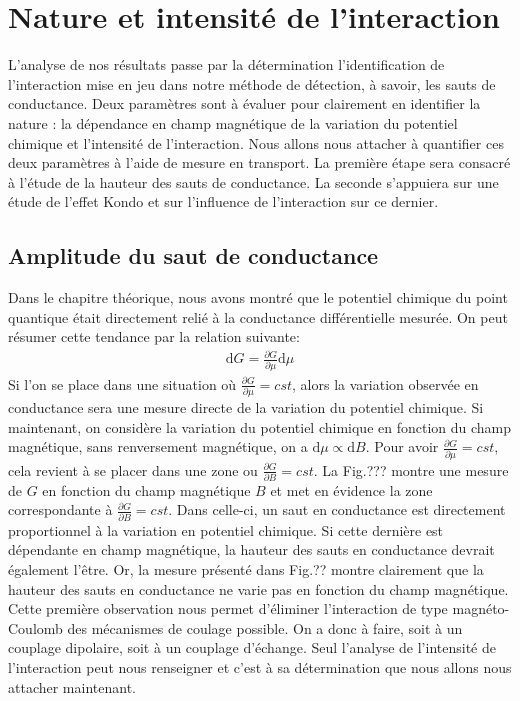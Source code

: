 \section{Nature et intensité de l'interaction}
L'analyse de nos résultats passe par la détermination l'identification de l'interaction mise en jeu dans notre méthode de détection, à savoir, les sauts de conductance. Deux paramètres sont à évaluer pour clairement en identifier la nature : la dépendance en champ magnétique de la variation du potentiel chimique et l'intensité de l'interaction. Nous allons nous attacher à quantifier ces deux paramètres à l'aide de mesure en transport. La première étape sera consacré à l'étude de la hauteur des sauts de conductance. La seconde s'appuiera sur une étude de l'effet Kondo et sur l'influence de l'interaction sur ce dernier.

\subsection{Amplitude du saut de conductance}
Dans le chapitre théorique, nous avons montré que le potentiel chimique du point quantique était directement relié à la conductance différentielle mesurée. On peut résumer cette tendance par la relation suivante:
\begin{eqnarray}
\text{d}G = \frac{\partial G}{\partial \mu} \text{d} \mu
\end{eqnarray}
Si l'on se place dans une situation où $\frac{\partial G}{\partial \mu} = cst$, alors la variation observée en conductance sera une mesure directe de la variation du potentiel chimique. Si maintenant, on considère la variation du potentiel chimique en fonction du champ magnétique, sans renversement magnétique, on a $\text{d}\mu \propto \text{d}B$. Pour avoir $\frac{\partial G}{\partial \mu} = cst$, cela revient à se placer dans une zone ou $\frac{\partial G}{\partial B} = cst$. La Fig.??? montre une mesure de $G$ en fonction du champ magnétique $B$ et met en évidence la zone correspondante à $\frac{\partial G}{\partial B} = cst$. Dans celle-ci, un saut en conductance est directement proportionnel à la variation en potentiel chimique. Si cette dernière est dépendante en champ magnétique, la hauteur des sauts en conductance devrait également l’être. Or, la mesure présenté dans Fig.?? montre clairement que la hauteur des sauts en conductance ne varie pas en fonction du champ magnétique. Cette première observation nous permet d'éliminer l'interaction de type magnéto-Coulomb des mécanismes de coulage possible. On a donc à faire, soit à un couplage dipolaire, soit à un couplage d'échange. Seul l'analyse de l'intensité de l'interaction peut nous renseigner et c'est à sa détermination que nous allons nous attacher maintenant.

